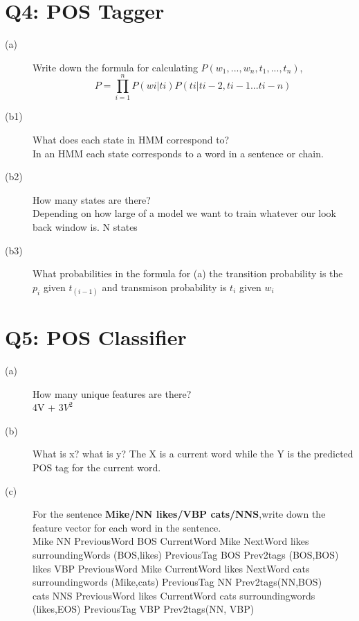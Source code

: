 \documentclass[11pt]{article}
\begin{document}
\section{ Q4: POS Tagger}
 \begin{description}
  \item [(a)]Write down the formula for calculating $P(w_1, ..., w_n, t_1, ..., t_n)$, 
\begin{equation}
 P =\prod_{i=1}^n P(wi|ti)P(ti|ti-2, ti-1...ti-n) 
\end{equation}
  \item [(b1)]What does each state in HMM correspond to? \\ In an HMM each state corresponds to a word in a sentence or chain. 
  \item [(b2)]How many states are there? \\Depending on how large of a model we want to train whatever our look back window is. N states  
\item [(b3)]What probabilities in the formula for (a) the transition probability is the $p_i$ given $t_(i-1)$  and transmison probability is $t_i$ given $w_i$
 \end{description}
\section{ Q5: POS Classifier}
 \begin{description}
  \item [(a)]How many unique features are there? \\ 4V + $3V^2$
  \item [(b)]What is x? what is y? The X is a current word while the Y is the predicted POS tag for the current word.
  \item [(c)]For the sentence {\bf Mike/NN likes/VBP cats/NNS},write down the feature vector for each word in the sentence.\\ Mike NN PreviousWord BOS CurrentWord Mike NextWord likes surroundingWords (BOS,likes) PreviousTag BOS Prev2tags (BOS,BOS) \\ likes VBP PreviousWord Mike CurrentWord likes NextWord cats surroundingwords (Mike,cats) PreviousTag NN Prev2tags(NN,BOS) \\ cats NNS PreviousWord likes CurrentWord cats surroundingwords (likes,EOS)  PreviousTag VBP Prev2tags(NN, VBP)
 \end{description} 
\end{document}
